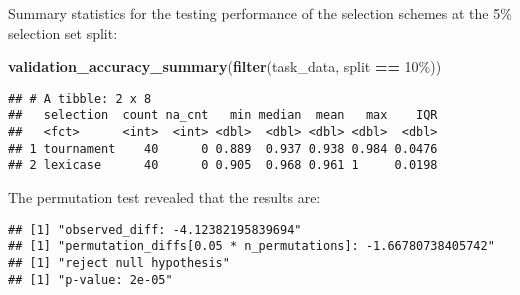 \documentclass[
]{book}
\newenvironment{Shaded}{\begin{snugshade}}{\end{snugshade}}
\newcommand{\AttributeTok}[1]{\textcolor[rgb]{0.13,0.29,0.53}{#1}}
\newcommand{\DecValTok}[1]{\textcolor[rgb]{0.00,0.00,0.81}{#1}}
\newcommand{\FunctionTok}[1]{\textcolor[rgb]{0.13,0.29,0.53}{\textbf{#1}}}
\newcommand{\NormalTok}[1]{#1}
\newcommand{\OtherTok}[1]{\textcolor[rgb]{0.56,0.35,0.01}{#1}}
\newcommand{\SpecialCharTok}[1]{\textcolor[rgb]{0.81,0.36,0.00}{\textbf{#1}}}
\newcommand{\StringTok}[1]{\textcolor[rgb]{0.31,0.60,0.02}{#1}}
\begin{document}
Summary statistics for the testing performance of the selection schemes at the 5\% selection set split:

\begin{Shaded}
\begin{Highlighting}[]
\FunctionTok{validation\_accuracy\_summary}\NormalTok{(}\FunctionTok{filter}\NormalTok{(task\_data, split }\SpecialCharTok{==} \StringTok{\textquotesingle{}10\%\textquotesingle{}}\NormalTok{))}
\end{Highlighting}
\end{Shaded}

\begin{verbatim}
## # A tibble: 2 x 8
##   selection  count na_cnt   min median  mean   max    IQR
##   <fct>      <int>  <int> <dbl>  <dbl> <dbl> <dbl>  <dbl>
## 1 tournament    40      0 0.889  0.937 0.938 0.984 0.0476
## 2 lexicase      40      0 0.905  0.968 0.961 1     0.0198
\end{verbatim}

The permutation test revealed that the results are:

\begin{Shaded}
\end{Shaded}

\begin{verbatim}
## [1] "observed_diff: -4.12382195839694"
## [1] "permutation_diffs[0.05 * n_permutations]: -1.66780738405742"
## [1] "reject null hypothesis"
## [1] "p-value: 2e-05"
\end{verbatim}
\end{document}
